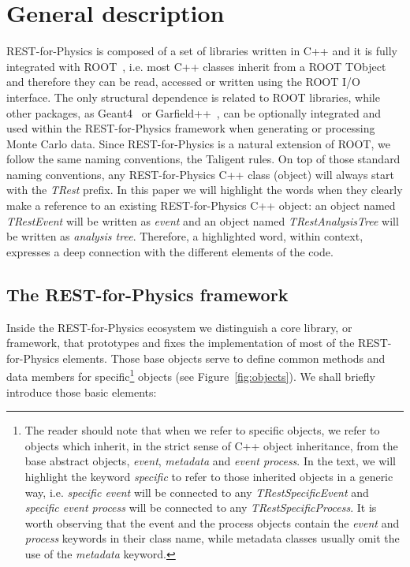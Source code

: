 \section{General description}
\label{sec:framework}

REST-for-Physics is composed of a set of libraries written in C++ and it is fully integrated with ROOT~\cite{ROOT,Brun:2011Gp,ROOT2011}, i.e. most C++ classes inherit from a ROOT TObject and therefore they can be read, accessed or written using the ROOT I/O interface. The only structural dependence is related to ROOT libraries, while other packages, as Geant4~\cite{Agostinelli:2002hh} or Garfield++~\cite{Garfield}, can be optionally integrated and used within the REST-for-Physics framework when generating or processing Monte Carlo data. Since REST-for-Physics is a natural extension of ROOT, we follow the same naming conventions, the Taligent rules. On top of those standard naming conventions, any REST-for-Physics C++ class (object) will always start with the \emph{TRest} prefix. In this paper we will highlight the words when they clearly make a reference to an existing REST-for-Physics C++ object: an object named \emph{TRestEvent} will be written as \emph{event} and an object named \emph{TRestAnalysisTree} will be written as \emph{analysis tree}. Therefore, a highlighted word, within context, expresses a deep connection with the different elements of the code.

\subsection{The REST-for-Physics framework}
Inside the REST-for-Physics ecosystem we distinguish a core library, or framework, that prototypes and fixes the implementation of most of the REST-for-Physics elements. Those base objects serve to define common methods and data members for specific\footnote{The reader should note that when we refer to specific objects, we refer to objects which inherit, in the strict sense of C++ object inheritance, from the base abstract objects, \emph{event}, \emph{metadata} and \emph{event process}. In the text, we will highlight the keyword \emph{specific} to refer to those inherited objects in a generic way, i.e. \emph{specific event} will be connected to any \emph{TRestSpecificEvent} and \emph{specific event process} will be connected to any \emph{TRestSpecificProcess}. It is worth observing that the event and the process objects contain the \emph{event} and \emph{process} keywords in their class name, while metadata classes usually omit the use of the \emph{metadata} keyword. } objects (see Figure~\ref{fig:objects}). We shall briefly introduce those basic elements:

